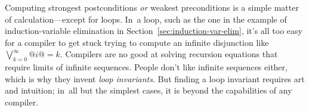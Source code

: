 \documentclass[blockstyle,preprint,nocopyrightspace]{sigplanconf}
\newcommand\secref[1]{Section~\ref{sec:#1}}
\begin{document}
Computing strongest postconditions \emph{or} weakest
preconditions is a simple matter of calculation---except for loops.
In~a loop, such as the one in the example of induction-variable elimination in
\secref{induction-var-elim}, 
it's all too easy for a compiler to get stuck trying to compute an
infinite disjunction like $\bigvee_{k=0}^{\infty} @i@=k$.
Compilers are no good at solving recursion
equations that require limits of infinite sequences.
%
People don't like infinite sequences either, which is why they invent
\emph{loop invariants}. 
But finding a loop invariant requires art and intuition;
in~all but the simplest cases, it is beyond the capabilities of any
compiler.

\end{document}
